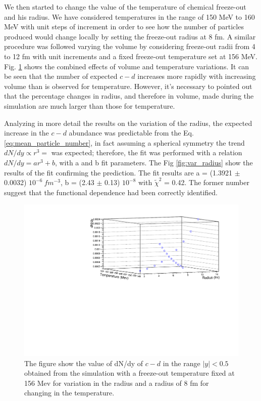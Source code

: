 \documentclass[12pt,a4paper]{book}
\begin{document}
	We then started to change the value of the temperature of chemical freeze-out and his radius. We have considered temperatures in the range of 150 MeV to 160 MeV with unit steps of increment in order to see how the number of particles produced would change locally by setting the freeze-out radius at 8 fm. A similar procedure was followed varying the volume by considering freeze-out radii from 4 to 12 fm with unit increments and a fixed freeze-out temperature set at 156 MeV. Fig. \ref{fig:2dgraph} shows the combined effects of volume and temperature variations. It can be seen that the number of expected $c-d$ increases more rapidly with increasing volume than is observed for temperature. However, it's necessary to pointed out that the percentage changes in radius, and therefore in volume, made during the simulation are much larger than those for temperature.
	
  Analyzing in more detail the results on the variation of the radius, the expected increase in the $c-d$ abundance  was predictable from the Eq. \ref{eq:mean_particle_number}, in fact assuming a spherical symmetry the trend $dN/dy \propto r^3 = $ was expected; therefore, the fit was performed with a relation $dN/dy =a r^3 +b$, with a and b fit parameters. The Fig \ref{fig:var_radius} show the results of the fit confirming the prediction. The fit results are  a = (1.3921 $\pm$ 0.0032) $10^{-6} \ fm^{-3}$, b = (2.43 $\pm$ 0.13) $10^{-8}$ with $\tilde{\chi}^2$ = 0.42. The former number suggest that the functional dependence had been correctly identified.   
	\begin{figure}
		\centering
			\includegraphics[width=0.9 \linewidth]{pictures/2dgraph.pdf}
		\caption{The figure show the value of dN/dy of $c-d$ in the range $|y|<0.5$ obtained from the simulation with a freeze-out temperature fixed at 156 Mev for variation in the radius and a radius of 8 fm for changing in the temperature.}
		\label{fig:2dgraph}
	\end{figure}
	
\end{document}
